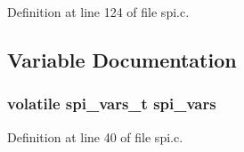 Definition at line 124 of file spi.\+c.



\subsection{Variable Documentation}
\subsubsection[{\texorpdfstring{spi\+\_\+vars}{spi_vars}}]{\setlength{\rightskip}{0pt plus 5cm}volatile {\bf spi\+\_\+vars\+\_\+t} spi\+\_\+vars}\hypertarget{iot-lab___a8-_m3_2spi_8c_a3fc8dc89994006cd0925b1b0efb0f189}{}\label{iot-lab___a8-_m3_2spi_8c_a3fc8dc89994006cd0925b1b0efb0f189}


Definition at line 40 of file spi.\+c.

